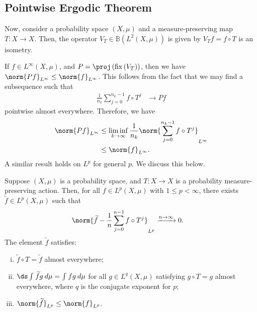 \documentclass[10pt]{mypackage}
\begin{document}
\subsection{Pointwise Ergodic Theorem}%
Now, consider a probability space $\left( X,\mu \right)$ and a measure-preserving map $T\colon X\rightarrow X$. Then, the operator $V_T\in \mathbb{B}\left( L^2\left( X,\mu \right) \right)$ is given by $V_Tf = f\circ T$ is an isometry.

If $f\in L^{\infty}\left(X,\mu\right)$, and $P = \proj\left( \operatorname{fix}\left( V_T \right) \right)$, then we have $\norm{Pf}_{L^{\infty}}\leq \norm{f}_{L^{\infty}}$. This follows from the fact that we may find a subsequence such that
\begin{align*}
  \frac{1}{n_k}\sum_{j=0}^{n_k-1}f\circ T^{j} &\rightarrow Pf
\end{align*}
pointwise almost everywhere. Therefore, we have
\begin{align*}
  \norm{Pf}_{L^{\infty}} &\leq \liminf_{k\rightarrow\infty} \frac{1}{n_k}\norm{\sum_{j=0}^{n_k-1}f\circ T^{j}}_{L^{\infty}}\\
                         &\leq \norm{f}_{L^{\infty}}.
\end{align*}
A similar result holds on $L^p$ for general $p$. We discuss this below.
\begin{corollary}
  Suppose $\left( X,\mu \right)$ is a probability space, and $T\colon X\rightarrow X$ is a probability measure-preserving action. Then, for all $f\in L^p\left( X,\mu \right)$ with $1\leq p < \infty$, there exists $ \widetilde{f}\in L^p\left( X,\mu \right) $ such that
  \begin{align*}
    \norm{\widetilde{f} - \frac{1}{n}\sum_{j=0}^{n-1}f\circ T^{j}}_{L^p} &\xrightarrow{n\to \infty}0.
  \end{align*}
  The element $ \widetilde{f} $ satisfies:
  \begin{enumerate}[(i)]
    \item $\widetilde{f}\circ T = \widetilde{f}$ almost everywhere;
    \item $ \ds \int_{}^{} \widetilde{f}g\:d\mu = \int_{}^{} fg\:d\mu $ for all $g\in L^{q}\left( X,\mu \right)$ satisfying $g\circ T = g$ almost everywhere, where $q$ is the conjugate exponent for $p$;
    \item $\norm{\widetilde{f}}_{L^p}\leq \norm{f}_{L^p}$.
  \end{enumerate}
\end{corollary}
\end{document}
